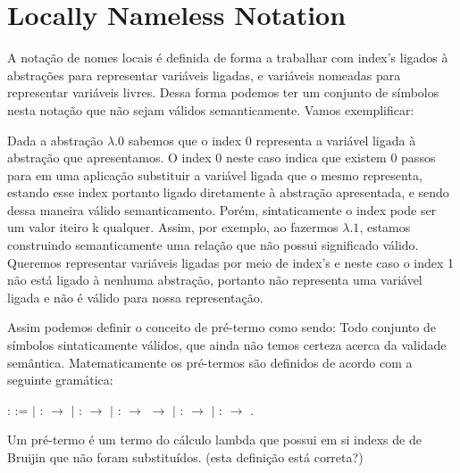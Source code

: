 
\begin{coqdoccode}
\coqdocemptyline
\end{coqdoccode}
\section{Locally Nameless Notation}

\begin{coqdoccode}
\coqdocemptyline
\coqdocemptyline
\end{coqdoccode}
A notação de nomes locais é definida de forma a trabalhar com index's ligados à abstrações
para representar variáveis ligadas, e variáveis nomeadas para representar variáveis livres. Dessa
forma podemos ter um conjunto de símbolos nesta notação que não sejam válidos semanticamente. 
Vamos exemplificar: 


Dada a abstração $\lambda.0$ sabemos que o index 0 representa a variável ligada à abstração
que apresentamos. O index 0 neste caso indica que existem 0 passos para em uma aplicação
substituir a variável ligada que o mesmo representa, estando esse index portanto ligado
diretamente à abstração apresentada, e sendo dessa maneira válido semanticamento. Porém,
sintaticamente o index pode ser um valor iteiro k qualquer. Assim, por exemplo, ao 
fazermos $\lambda.1$, estamos construindo semanticamente uma relação que não possui 
significado válido. Queremos representar variáveis ligadas por meio de index's e neste caso o 
index 1 não está ligado à nenhuma abstração, portanto não representa uma variável ligada
e não é válido para nossa representação.

 Assim podemos definir o conceito de pré-termo como sendo: Todo conjunto de símbolos sintaticamente
válidos, que ainda não temos certeza acerca da validade semântica. Matematicamente os pré-termos 
são definidos de acordo com a seguinte gramática: \begin{coqdoccode}
\coqdocemptyline
\coqdocnoindent
{}  :  :=\coqdoceol
\coqdocindent{1.00em}
\ensuremath{|}  :  \ensuremath{\rightarrow} \coqdoceol
\coqdocindent{1.00em}
\ensuremath{|}  :  \ensuremath{\rightarrow} \coqdoceol
\coqdocindent{1.00em}
\ensuremath{|}   :  \ensuremath{\rightarrow}  \ensuremath{\rightarrow} \coqdoceol
\coqdocindent{1.00em}
\ensuremath{|}   :  \ensuremath{\rightarrow} \coqdoceol
\coqdocindent{1.00em}
\ensuremath{|}   :  \ensuremath{\rightarrow} .\coqdoceol
\coqdocemptyline
\end{coqdoccode}
Um pré-termo é um termo do cálculo lambda que possui em si indexs de de Bruijin que não foram
substituídos. (esta definição está correta?)


